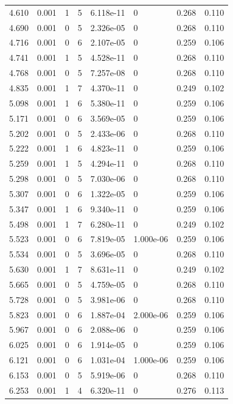 \documentclass[preview]{standalone}
\begin{document}
{{{\begin{tabular}{L{1.2cm}C{1.2cm} C{0.3cm}C{0.5cm} C{1.4cm}C{1.4cm} C{1.4cm}C{1.4cm}}
  4.610  &  0.001  & 1     &  5 &  6.118e-11  & 0  & 0.268 &  0.110   \\ 
  4.690  &  0.001  & 0     &  5 &  2.326e-05  & 0  & 0.268 &  0.110   \\ 
  4.716  &  0.001  & 0     &  6 &  2.107e-05  & 0  & 0.259 &  0.106   \\ 
  4.741  &  0.001  & 1     &  5 &  4.528e-11  & 0  & 0.268 &  0.110   \\ 
  4.768  &  0.001  & 0     &  5 &  7.257e-08  & 0  & 0.268 &  0.110   \\ 
  4.835  &  0.001  & 1     &  7 &  4.370e-11  & 0  & 0.249 &  0.102   \\ 
  5.098  &  0.001  & 1     &  6 &  5.380e-11  & 0  & 0.259 &  0.106   \\ 
  5.171  &  0.001  & 0     &  6 &  3.569e-05  & 0  & 0.259 &  0.106   \\ 
  5.202  &  0.001  & 0     &  5 &  2.433e-06  & 0  & 0.268 &  0.110   \\ 
  5.222  &  0.001  & 1     &  6 &  4.823e-11  & 0  & 0.259 &  0.106   \\ 
  5.259  &  0.001  & 1     &  5 &  4.294e-11  & 0  & 0.268 &  0.110   \\ 
  5.298  &  0.001  & 0     &  5 &  7.030e-06  & 0  & 0.268 &  0.110   \\ 
  5.307  &  0.001  & 0     &  6 &  1.322e-05  & 0  & 0.259 &  0.106   \\ 
  5.347  &  0.001  & 1     &  6 &  9.340e-11  & 0  & 0.259 &  0.106   \\ 
  5.498  &  0.001  & 1     &  7 &  6.280e-11  & 0  & 0.249 &  0.102   \\ 
  5.523  &  0.001  & 0     &  6 &  7.819e-05  & 1.000e-06  & 0.259 &  0.106   \\ 
  5.534  &  0.001  & 0     &  5 &  3.696e-05  & 0  & 0.268 &  0.110   \\ 
  5.630  &  0.001  & 1     &  7 &  8.631e-11  & 0  & 0.249 &  0.102   \\ 
  5.665  &  0.001  & 0     &  5 &  4.759e-05  & 0  & 0.268 &  0.110   \\ 
  5.728  &  0.001  & 0     &  5 &  3.981e-06  & 0  & 0.268 &  0.110   \\ 
  5.823  &  0.001  & 0     &  6 &  1.887e-04  & 2.000e-06  & 0.259 &  0.106   \\ 
  5.967  &  0.001  & 0     &  6 &  2.088e-06  & 0  & 0.259 &  0.106   \\ 
  6.025  &  0.001  & 0     &  6 &  1.914e-05  & 0  & 0.259 &  0.106   \\ 
  6.121  &  0.001  & 0     &  6 &  1.031e-04  & 1.000e-06  & 0.259 &  0.106   \\ 
  6.153  &  0.001  & 0     &  5 &  5.919e-06  & 0  & 0.268 &  0.110   \\ 
  6.253  &  0.001  & 1     &  4 &  6.320e-11  & 0  & 0.276 &  0.113   \\ 
\hline 
\end{tabular} 

}}}
\end{document}
